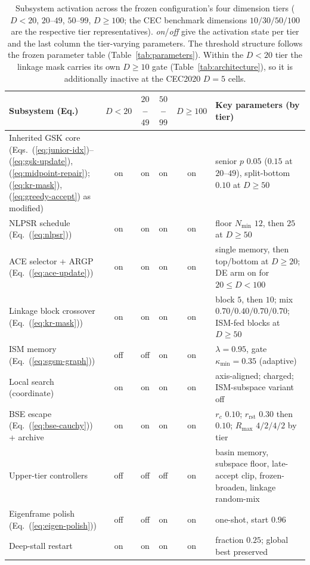 \begin{table}[t]
\caption{Subsystem activation across the frozen configuration's four
dimension tiers ($D<20$, $20$--$49$, $50$--$99$, $D\geq100$; the CEC benchmark
dimensions $10/30/50/100$ are the respective tier representatives).
\emph{on}/\emph{off} give the activation state per tier and the last column the
tier-varying parameters. The threshold structure follows the frozen parameter
table (Table~\ref{tab:parameters}). Within the $D{<}20$ tier the linkage mask
carries its own $D\geq10$ gate (Table~\ref{tab:architecture}), so it is
additionally inactive at the CEC2020 $D=5$ cells.}
\label{tab:dim-gating}
\centering
\footnotesize
\zebra
\begin{tabular}{p{3.2cm}cccc p{3.9cm}}
\toprule
\textbf{Subsystem (Eq.)} & \textbf{$D{<}20$} & \textbf{$20$--$49$} & \textbf{$50$--$99$} & \textbf{$D{\ge}100$} & \textbf{Key parameters (by tier)} \\
\midrule
Inherited GSK core (Eqs.~(\ref{eq:junior-idx})--(\ref{eq:gsk-update}), (\ref{eq:midpoint-repair}); (\ref{eq:kr-mask}), (\ref{eq:greedy-accept}) as modified) & on & on & on & on & senior $p$ $0.05$ ($0.15$ at $20$--$49$), split-bottom $0.10$ at $D{\ge}50$ \\
NLPSR schedule (Eq.~(\ref{eq:nlpsr})) & on & on & on & on & floor $N_{\min}$ $12$, then $25$ at $D{\ge}50$ \\
ACE selector + ARGP (Eq.~(\ref{eq:ace-update})) & on & on & on & on & single memory, then top/bottom at $D{\ge}20$; DE arm on for $20{\le}D{<}100$ \\
Linkage block crossover (Eq.~(\ref{eq:kr-mask})) & on & on & on & on & block $5$, then $10$; mix $0.70/0.40/0.70/0.70$; ISM-fed blocks at $D{\ge}50$ \\
ISM memory (Eq.~(\ref{eq:sgsm-graph})) & off & off & on & on & $\lambda{=}0.95$, gate $\kappa_{\min}{=}0.35$ (adaptive) \\
Local search (coordinate) & on & on & on & on & axis-aligned; charged; ISM-subspace variant off \\
BSE escape (Eq.~(\ref{eq:bse-cauchy})) + archive & on & on & on & on & $r_{c}$ $0.10$; $r_{\mathrm{rst}}$ $0.30$ then $0.10$; $R_{\max}$ $4/2/4/2$ by tier \\
Upper-tier controllers & off & off & off & on & basin memory, subspace floor, late-accept clip, frozen-broaden, linkage random-mix \\
Eigenframe polish (Eq.~(\ref{eq:eigen-polish})) & off & off & on & on & one-shot, start $0.96$ \\
Deep-stall restart & on & on & on & on & fraction $0.25$; global best preserved \\
\bottomrule
\end{tabular}
\end{table}

